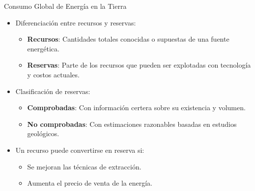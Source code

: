 \documentclass[main.tex]{subfiles}
\begin{document}
\begin{frame}{Consumo Global de Energía en la Tierra}
    \begin{itemize}
        \item Diferenciación entre recursos y reservas:
        \begin{itemize}
            \item \textbf{Recursos}: Cantidades totales conocidas o supuestas de una fuente energética.
            \item \textbf{Reservas}: Parte de los recursos que pueden ser explotadas con tecnología y costos actuales.
        \end{itemize}
        \item Clasificación de reservas:
        \begin{itemize}
            \item \textbf{Comprobadas}: Con información certera sobre su existencia y volumen.
            \item \textbf{No comprobadas}: Con estimaciones razonables basadas en estudios geológicos.
        \end{itemize}
        \item Un recurso puede convertirse en reserva si:
        \begin{itemize}
            \item Se mejoran las técnicas de extracción.
            \item Aumenta el precio de venta de la energía.
        \end{itemize}
    \end{itemize}
\end{frame}
\end{document}

